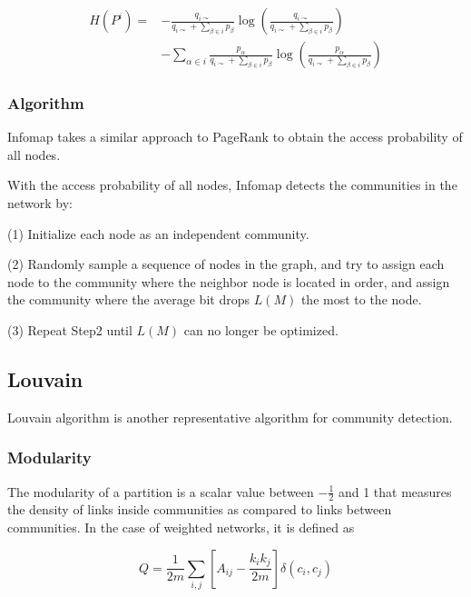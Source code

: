 \documentclass[fleqn,10pt]{SelfArx} %
\begin{document}
	\begin{small}
	\begin{equation}
		\begin{split}
			H\left(P^{i}\right)=&-\frac{q_{i\curvearrowright}}{q_{i \curvearrowright}+\sum_{\beta \in i} p_{\beta}} \log \left(\frac{q_{i \curvearrowright}}
			{q_{i \curvearrowright}+\sum_{\beta \in i} p_{\beta}}\right) \\
			&-\sum_{\alpha \in i} \frac{p_{\alpha}}{q_{i \curvearrowright}+\sum_{\beta \in i} p_{\beta}} \log \left(\frac{p_{\alpha}}{q_{i \curvearrowright}+\sum_{\beta \in i} p_{\beta}}\right)
		\end{split}
	\end{equation}
	\end{small}
	
	\subsubsection{Algorithm}
	\noindent
	Infomap takes a similar approach to PageRank to obtain the access probability of all nodes.
	
	\noindent
	With the access probability of all nodes, Infomap detects the communities in the network by:
	
	\noindent
	(1) Initialize each node as an independent community. 
	
	\noindent
	(2) Randomly sample a sequence of nodes in the graph, and try to  	assign each node to the community where the neighbor node is located in order, and assign the community where the average bit drops $L(M)$ the most to the node. 
	
	\noindent
	(3) Repeat Step2 until $L(M)$ can no longer be optimized.
	
	\subsection{Louvain}
	Louvain algorithm is another representative algorithm for community detection.   
	\subsubsection{Modularity}
	The modularity of a partition is a scalar value between $-\frac{1}{2}$ and 1 that measures the density of links inside communities as compared to links between communities. In the case of weighted networks, it is defined as
	
	\begin{equation}
		Q=\frac{1}{2 m} \sum_{i, j}\left[A_{i j}-\frac{k_{i} k_{j}}{2 m}\right] \delta\left(c_{i}, c_{j}\right)
	\end{equation}
	
\end{document}
